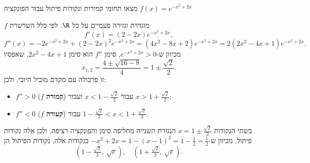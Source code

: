 
\begin{question}
מצאו תחומי קמירות ונקודות פיתול עבור הפונקציה $f(x)=e^{-x^2+2x}$
\end{question}

\begin{solution}
$f$ מוגדרת וגזירה פעמיים על כל $\R$. לפי כלל השרשרת
\[ f'(x)=(2-2x)e^{-x^2+2x}, \]
\[ f''(x)=-2e^{-x^2+2x}+(2-2x)^2e^{-x^2+2x}=(4x^2-8x+2)e^{-x^2+2x}=2(2x^2-4x+1)e^{-x^2+2x}. \]
מכיוון ש-$e^{-x^2+2x}>0$, סימן $f''$ הוא סימן $2x^2-4x+1$, שאפסיו
\[ x_{1,2}=\frac{4\pm\sqrt{16-8}}{4}=1\pm\frac{\sqrt2}{2}. \]
זו פרבולה עם מקדם מוביל חיובי, ולכן:
\begin{itemize}
  \item $f''>0$ ($f$ \textbf{קמורה}) עבור $x<1-\frac{\sqrt2}{2}$ ועבור $x>1+\frac{\sqrt2}{2}$;
  \item $f''<0$ ($f$ \textbf{קעורה}) עבור $1-\frac{\sqrt2}{2}<x<1+\frac{\sqrt2}{2}$.
\end{itemize}
בשתי הנקודות $x=1\pm\frac{\sqrt2}{2}$ הנגזרת השנייה מחליפה סימן והפונקציה רציפה, ולכן אלה נקודות פיתול. מכיוון ש-$-x^2+2x=1-(x-1)^2=1-\frac12=\frac12$ בנקודות אלה, נקודות הפיתול הן
\[ \boxed{\left(1-\tfrac{\sqrt2}{2},\ \sqrt e\right),\quad \left(1+\tfrac{\sqrt2}{2},\ \sqrt e\right)}. \]
\end{solution}
